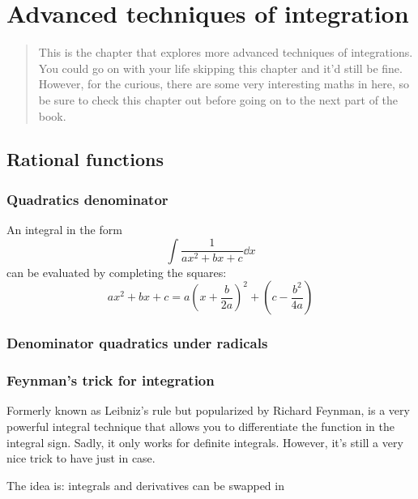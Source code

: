 \chapter{Advanced techniques of integration}
\label{sec:advancedtechniquesofintegration}

\begin{abstract}
    This is the chapter that explores more advanced techniques of integrations. You could go on with your life skipping this chapter and it'd still be fine. However, for the curious, there are some very interesting maths in here, so be sure to check this chapter out before going on to the next part of the book.
\end{abstract}

\section{Rational functions}
\label{eq:advtechniquesrationalfunctions}

\subsection{Quadratics denominator}

An integral in the form
\begin{equation}
    \int \frac{1}{ax^2 + bx + c}\dd{x}
\end{equation}
can be evaluated by completing the squares:
\begin{equation}
    ax^2 + bx + c = a\left(x + \frac{b}{2a}\right)^2 + \left(c - \frac{b^2}{4a}\right)
\end{equation}

\subsection{Denominator quadratics under radicals}

\subsection{Feynman's trick for integration}

Formerly known as Leibniz's rule but popularized by Richard Feynman, is a very powerful integral technique that allows you to differentiate the function in the integral sign. Sadly, it only works for definite integrals. However, it's still a very nice trick to have just in case.

The idea is: integrals and derivatives can be swapped in 